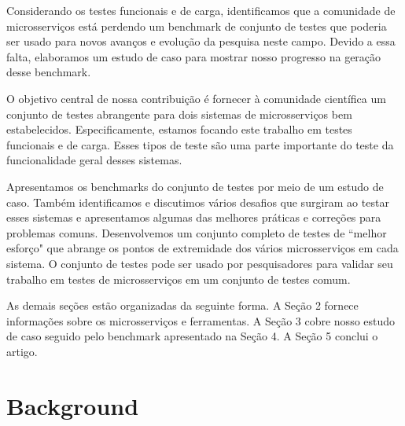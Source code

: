 
Considerando os testes funcionais e de carga, identificamos que a comunidade de microsserviços está perdendo um benchmark de conjunto de testes que poderia ser usado para novos avanços e evolução da pesquisa neste campo. Devido a essa falta, elaboramos um estudo de caso para mostrar nosso progresso na geração desse benchmark.

O objetivo central de nossa contribuição é fornecer à comunidade científica um conjunto de testes abrangente para dois sistemas de microsserviços bem estabelecidos. Especificamente, estamos focando este trabalho em testes funcionais e de carga. Esses tipos de teste são uma parte importante do teste da funcionalidade geral desses sistemas.

Apresentamos os benchmarks do conjunto de testes por meio de um estudo de caso. Também identificamos e discutimos vários desafios que surgiram ao testar esses sistemas e apresentamos algumas das melhores práticas e correções para problemas comuns. Desenvolvemos um conjunto completo de testes de ``melhor esforço" que abrange os pontos de extremidade dos vários microsserviços em cada sistema. O conjunto de testes pode ser usado por pesquisadores para validar seu trabalho em testes de microsserviços em um conjunto de testes comum.

As demais seções estão organizadas da seguinte forma. A Seção 2 fornece informações sobre os microsserviços e ferramentas. A Seção 3 cobre nosso estudo de caso seguido pelo benchmark apresentado na Seção 4. A Seção 5 conclui o artigo.

\section{Background}\label{sec:fundo}

